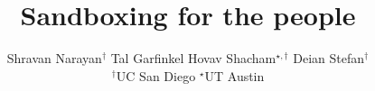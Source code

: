 \documentclass[letterpaper,twocolumn,10pt]{article}
\date{\vspace{-1em}}
\begin{document}
\setlength{\droptitle}{-2em}

\title{Sandboxing for the people\vspace{-1.2em}}


\newcommand{\ucsdmark}{{$^{\dagger}$}\xspace}
\newcommand{\stanmark}{{$^{\ast}$}}
\newcommand{\mozmark}{{$^{\diamond}$}\xspace}
\newcommand{\utmark}{{$^{\star}$}\xspace}


\author{
    Shravan Narayan\ucsdmark
    \quad
    Tal Garfinkel%
    \quad
    \quad
    Hovav Shacham$^{\star,\dagger}$
    \quad
    Deian Stefan\ucsdmark
    \\
    \small{
      \ucsdmark{UC San Diego}\qquad
      \utmark{UT Austin}\qquad
    }
} %

\maketitle






{
\fontsize{7}{8}\selectfont
\setlength{\bibsep}{3pt}


}
\end{document}
